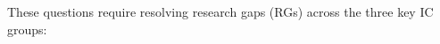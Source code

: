 \documentclass[10pt]{article}
\begin{document}
These questions require resolving research gaps (RGs) across the three key IC groups:


%
%
%
%
%
%
\end{document}
